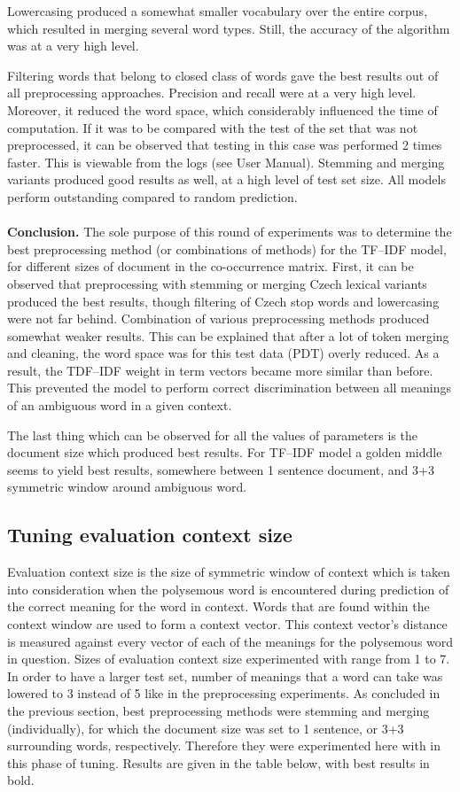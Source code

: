 Lowercasing produced a somewhat smaller vocabulary over the entire corpus, which resulted in merging 
several word types. Still, the accuracy of the algorithm was at a very high level.

Filtering words that belong to closed class of words gave the best results out of all preprocessing 
approaches. Precision and recall were at a very high level.
Moreover, it reduced the word space, which considerably influenced the time of computation. If it was to
be compared with the test of the set that was not preprocessed, it can be observed that testing in this 
case was performed 2 times faster. This is viewable from the logs (see User Manual).
Stemming and merging variants produced good results as well, at a high level of test set size. 
All models perform outstanding compared to random prediction. 
\\\\
\textbf{Conclusion.} 
The sole purpose of this round of experiments was to determine the best preprocessing method (or combinations of methods) for the TF--IDF model, for different sizes of document in the co-occurrence matrix. 
First, it can be observed that preprocessing with stemming or merging Czech lexical variants produced the
best results, though filtering of Czech stop words and lowercasing were not far behind. Combination of various preprocessing methods produced somewhat weaker results. This can be explained that after a lot of token merging and cleaning, the word space was for this test data (PDT) overly reduced. As a result, the TDF--IDF weight in term vectors became more similar than before. This prevented the model to perform correct discrimination between all 
meanings of an ambiguous word in a given context.

The last thing which can be observed for all the values of parameters is the document size which 
produced best results. For TF--IDF model a golden middle seems to yield best results, somewhere 
between 1 sentence document, and 3+3 symmetric window around ambiguous word.


\subsection{Tuning evaluation context size}
Evaluation context size is the size of symmetric window of context which is taken into consideration 
when the polysemous word is encountered during prediction of the correct meaning for the word in context. Words that are found within the context
window are used to form a context vector. This context vector's distance is measured against every
vector of each  of the meanings for the polysemous word in question. Sizes of evaluation context size 
experimented with range from 1 to 7. In order to have a larger test set, number of meanings that 
a word can take was lowered to 3 instead of 5 like in the preprocessing experiments.
As concluded in the previous section, best preprocessing methods were stemming and merging (individually), for which the document size was set to 1 sentence, or 3+3 surrounding words, respectively. Therefore they were experimented here with in this phase of tuning. 
Results are given 
in the table below, with best results in bold.

